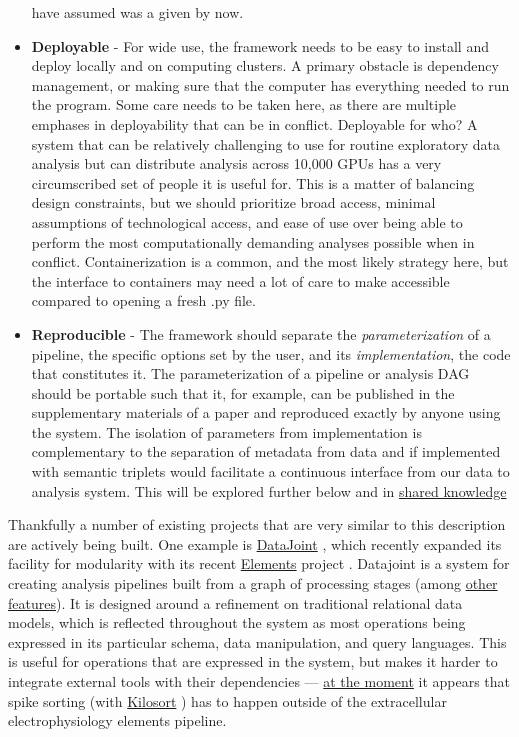 \begin{itemize}
  have assumed was a given by now.
\item
  \textbf{Deployable} - For wide use, the framework needs to be easy to
  install and deploy locally and on computing clusters. A primary
  obstacle is dependency management, or making sure that the computer
  has everything needed to run the program. Some care needs to be taken
  here, as there are multiple emphases in deployability that can be in
  conflict. Deployable for who? A system that can be relatively
  challenging to use for routine exploratory data analysis but can
  distribute analysis across 10,000 GPUs has a very circumscribed set of
  people it is useful for. This is a matter of balancing design
  constraints, but we should prioritize broad access, minimal
  assumptions of technological access, and ease of use over being able
  to perform the most computationally demanding analyses possible when
  in conflict. Containerization is a common, and the most likely
  strategy here, but the interface to containers may need a lot of care
  to make accessible compared to opening a fresh .py file.
\item
  \textbf{Reproducible} - The framework should separate the
  \emph{parameterization} of a pipeline, the specific options set by the
  user, and its \emph{implementation}, the code that constitutes it. The
  parameterization of a pipeline or analysis DAG should be portable such
  that it, for example, can be published in the supplementary materials
  of a paper and reproduced exactly by anyone using the system. The
  isolation of parameters from implementation is complementary to the
  separation of metadata from data and if implemented with semantic
  triplets would facilitate a continuous interface from our data to
  analysis system. This will be explored further below and in
  \protect\hyperlink{shared-knowledge}{shared knowledge}
\end{itemize}

Thankfully a number of existing projects that are very similar to this
description are actively being built. One example is
\href{https://datajoint.io/}{DataJoint} \citep{yatsenkoDataJointSimplerRelational2018} , which recently expanded its
facility for modularity with its recent
\href{https://github.com/datajoint/datajoint-elements}{Elements} project
\citep{yatsenkoDataJointElementsData2021} . Datajoint is a system
for creating analysis pipelines built from a graph of processing stages
(among
\href{https://docs.datajoint.org/python/v0.13/intro/01-Data-Pipelines.html\#what-is-datajoint}{other
features}). It is designed around a refinement on traditional relational
data models, which is reflected throughout the system as most operations
being expressed in its particular schema, data manipulation, and query
languages. This is useful for operations that are expressed in the
system, but makes it harder to integrate external tools with their
dependencies ---
\href{https://github.com/datajoint/element-array-ephys/blob/1fdbcf12d1a518e686b6b79e9fbe77b736cb606a/Background.md}{at
the moment} it appears that spike sorting (with
\href{https://github.com/MouseLand/Kilosort}{Kilosort} \citep{pachitariuKilosortRealtimeSpikesorting2016} ) has to happen outside
of the extracellular electrophysiology elements pipeline.

